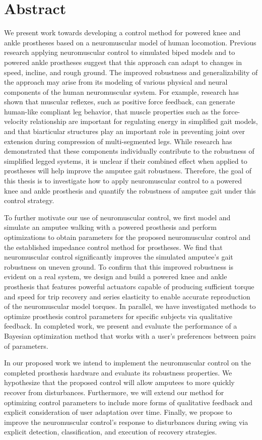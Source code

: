 \chapter*{Abstract}

We present work towards developing a control method for powered knee and ankle
prostheses based on a neuromuscular model of human locomotion. Previous research
applying neuromuscular control to simulated biped models and to powered ankle
prostheses suggest that this approach can adapt to changes in speed, incline,
and rough ground. The improved robustness and generalizability of the approach
may arise from its modeling of various physical and neural components of the
human neuromuscular system. For example, research has shown that muscular reflexes, 
such as positive force feedback, can generate human-like compliant leg behavior, 
that muscle properties such as the force-velocity relationship are important for
regulating energy in simplified gait models, and that biarticular structures
play an important role in preventing joint over extension during compression of
multi-segmented legs. While research has demonstrated that these components
individually contribute to the robustness of simplified legged systems, it is
unclear if their combined effect when applied to prostheses will help improve
the amputee gait robustness. Therefore, the goal of this thesis is to
investigate how to apply neuromuscular control to a powered knee and ankle
prosthesis and quantify the robustness of amputee gait under this control
strategy.

To further motivate our use of neuromuscular control, we first model and
simulate an amputee walking with a powered prosthesis and perform optimizations
to obtain parameters for the proposed neuromuscular control and the established
impedance control method for prostheses. We find that neuromuscular control
significantly improves the simulated amputee's gait robustness on uneven ground.
To confirm that this improved robustness is evident on a real system, we design
and build a powered knee and ankle prosthesis that features powerful actuators
capable of producing sufficient torque and speed for trip recovery and series
elasticity to enable accurate reproduction of the neuromuscular model torques.
In parallel, we have investigated methods to optimize prosthesis control
parameters for specific subjects via qualitative feedback. In completed work, we
present and evaluate the performance of a Bayesian optimization method that
works with a user's preferences between pairs of parameters.

In our proposed work we intend to implement the neuromuscular control on the
completed prosthesis hardware and evaluate its robustness properties. We
hypothesize that the proposed control will allow amputees to more quickly
recover from disturbances. Furthermore, we will extend our method for optimizing
control parameters to include more forms of qualitative feedback and explicit
consideration of user adaptation over time. Finally, we propose to improve the
neuromuscular control's response to disturbances during swing via explicit
detection, classification, and execution of recovery strategies.
